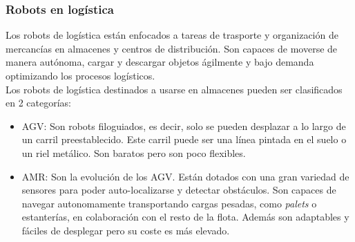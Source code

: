 \subsubsection{Robots en logística}
Los robots de logística están enfocados a tareas de trasporte y organización de mercancías en almacenes y centros de distribución. 
Son capaces de moverse de manera autónoma, cargar y descargar objetos ágilmente y bajo demanda optimizando los procesos logísticos. 
\\Los robots de logística destinados a usarse en almacenes pueden ser clasificados en 2 categorías:
\begin{itemize}
\item \ac{AGV}: Son robots filoguiados, es decir, solo se pueden desplazar a lo largo de un carril preestablecido. Este carril puede ser 
una línea pintada en el suelo o un riel metálico. Son baratos pero son poco flexibles.
\item \ac{AMR}: Son la evolución de los \acs{AGV}. Están dotados con una gran variedad de sensores para poder auto-localizarse y 
detectar obstáculos. Son capaces de navegar autonomamente transportando cargas pesadas, como \textit{palets} o estanterías, en colaboración 
con el resto de la flota. Además son adaptables y fáciles de desplegar pero su coste es más elevado.
\end{itemize}

